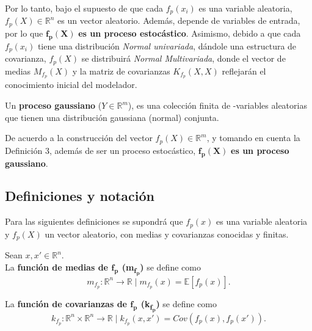 Por lo tanto, bajo el supuesto de que cada $f_p(x_i)$ es una variable aleatoria, $f_p(X) \in \mathbb{R}^n$ es un vector aleatorio. Adem\'as, depende de variables de entrada, por lo que $\bm{f_p(X)}$ \textbf{es un proceso estoc\'astico}. Asimismo, debido a que cada $f_p(x_i)$ tiene una distribuci\'on \textit{Normal univariada}, d\'andole una estructura de covarianza, $f_p(X)$ se distribuir\'a \textit{Normal Multivariada}, donde el vector de medias $M_{f_p}(X)$ y la matriz de covarianzas $K_{f_p}(X,X)$ reflejar\'an el conocimiento inicial del modelador.

\begin{defin}
    Un \textbf{proceso gaussiano} ($Y \in \mathbb{R}^m$), es una colección finita de -variables aleatorias que tienen una distribución gaussiana (normal) conjunta.
\end{defin}

\begin{obs*}
    De acuerdo a la construcci\'on del vector $f_p(X) \in \mathbb{R}^m$, y tomando en cuenta la Definici\'on 3, además de ser un proceso estoc\'astico, $\bm{f_p(X)}$ \textbf{es un proceso gaussiano}.
\end{obs*}


\subsection{Definiciones y notaci\'on}

Para las siguientes definiciones se supondrá que $f_p(x)$ es una variable aleatoria y $f_p(X)$ un vector aleatorio, con medias y covarianzas conocidas y finitas.

\begin{defin*}
Sean $x,x' \in \mathbb{R}^n$. \\

La \textbf{función de medias de $\bm{f_p}$ (m\textsubscript{$\bm{f_p}$})} se define como 
\begin{equation*}
    m_{f_p}: \mathbb{R}^n \rightarrow \mathbb{R} 
    \mid
    m_{f_p}(x) = \mathbb{E}[f_p(x)].
\end{equation*}

La \textbf{función de covarianzas de $\bm{f_p}$ (k\textsubscript{$\bm{f_p}$})} se define como 
\begin{equation*}
    k_{f_p}: \mathbb{R}^n \times \mathbb{R}^n \rightarrow \mathbb{R} 
    \mid
    k_{f_p}(x, x') = Cov({f_p}(x),{f_p}(x')).
\end{equation*}
\end{defin*}


